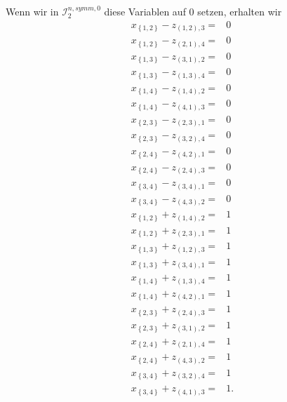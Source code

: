 \documentclass[10p,a4paper,BCOR = 12mm, DIV=15]{scrbook}
\begin{document}
{\begin{bew}
Wenn wir in $\mathcal{I}^{n, symm, 0}_2$ diese Variablen auf $0$ setzen, erhalten wir
{
\allowdisplaybreaks
\begin{align*}
x_{\left\{1, 2\right\}} - z_{\left(1, 2\right), 3} = & 0 \\
x_{\left\{1, 2\right\}} - z_{\left(2, 1\right), 4} = & 0 \\
x_{\left\{1, 3\right\}} - z_{\left(3, 1\right), 2} = & 0 \\
x_{\left\{1, 3\right\}} - z_{\left(1, 3\right), 4} = & 0 \\
x_{\left\{1, 4\right\}} - z_{\left(1, 4\right), 2} = & 0 \\
x_{\left\{1, 4\right\}} - z_{\left(4, 1\right), 3} = & 0 \\
x_{\left\{2, 3\right\}} - z_{\left(2, 3\right), 1} = & 0 \\
x_{\left\{2, 3\right\}} - z_{\left(3, 2\right), 4} = & 0 \\
x_{\left\{2, 4\right\}} - z_{\left(4, 2\right), 1} = & 0 \\
x_{\left\{2, 4\right\}} - z_{\left(2, 4\right), 3} = & 0 \\
x_{\left\{3, 4\right\}} - z_{\left(3, 4\right), 1} = & 0 \\
x_{\left\{3, 4\right\}} - z_{\left(4, 3\right), 2} = & 0 \\
x_{\left\{1, 2\right\}} + z_{\left(1, 4\right), 2} = & 1 \\
x_{\left\{1, 2\right\}} + z_{\left(2, 3\right), 1} = & 1 \\
x_{\left\{1, 3\right\}} + z_{\left(1, 2\right), 3} = & 1 \\
x_{\left\{1, 3\right\}} + z_{\left(3, 4\right), 1} = & 1 \\
x_{\left\{1, 4\right\}} + z_{\left(1, 3\right), 4} = & 1 \\
x_{\left\{1, 4\right\}} + z_{\left(4, 2\right), 1} = & 1 \\
x_{\left\{2, 3\right\}} + z_{\left(2, 4\right), 3} = & 1 \\
x_{\left\{2, 3\right\}} + z_{\left(3, 1\right), 2} = & 1 \\
x_{\left\{2, 4\right\}} + z_{\left(2, 1\right), 4} = & 1 \\
x_{\left\{2, 4\right\}} + z_{\left(4, 3\right), 2} = & 1 \\
x_{\left\{3, 4\right\}} + z_{\left(3, 2\right), 4} = & 1 \\
x_{\left\{3, 4\right\}} + z_{\left(4, 1\right), 3} = & 1.
\end{align*}
}


\end{bew}}
\end{document}
